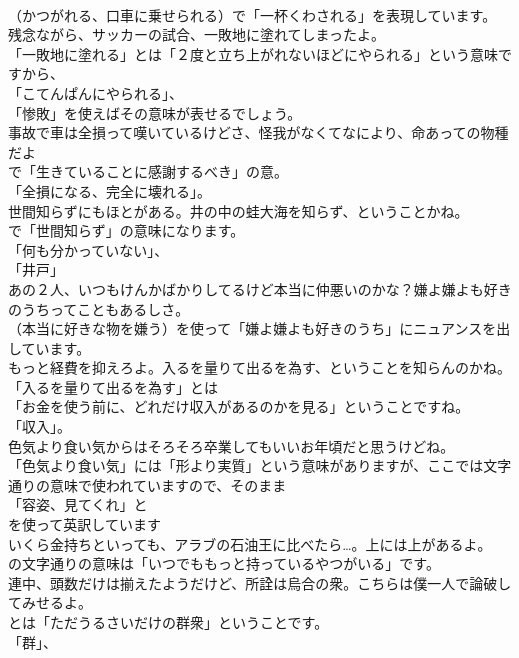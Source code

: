 \documentclass[8pt]{extreport}
\begin{document}
\begin{CJK}{UTF8}{min}
\\	（かつがれる、口車に乗せられる）で「一杯くわされる」を表現しています。	
\\	残念ながら、サッカーの試合、一敗地に塗れてしまったよ。 
\\	「一敗地に塗れる」とは「２度と立ち上がれないほどにやられる」という意味ですから、
\\	「こてんぱんにやられる」、
\\	「惨敗」を使えばその意味が表せるでしょう。	
\\	事故で車は全損って嘆いているけどさ、怪我がなくてなにより、命あっての物種だよ 
\\	で「生きていることに感謝するべき」の意。
\\	「全損になる、完全に壊れる」。	
\\	世間知らずにもほとがある。井の中の蛙大海を知らず、ということかね。 
\\	で「世間知らず」の意味になります。
\\	「何も分かっていない」、
\\	「井戸」	
\\	あの２人、いつもけんかばかりしてるけど本当に仲悪いのかな？嫌よ嫌よも好きのうちってこともあるしさ。 
\\	（本当に好きな物を嫌う）を使って「嫌よ嫌よも好きのうち」にニュアンスを出しています。	
\\	もっと経費を抑えろよ。入るを量りて出るを為す、ということを知らんのかね。 
\\	「入るを量りて出るを為す」とは
\\	「お金を使う前に、どれだけ収入があるのかを見る」ということですね。
\\	「収入」。	
\\	色気より食い気からはそろそろ卒業してもいいお年頃だと思うけどね。 
\\	「色気より食い気」には「形より実質」という意味がありますが、ここでは文字通りの意味で使われていますので、そのまま
\\	「容姿、見てくれ」と
\\	を使って英訳しています	
\\	いくら金持ちといっても、アラブの石油王に比べたら…。上には上があるよ。 
\\	の文字通りの意味は「いつでももっと持っているやつがいる」です。	
\\	連中、頭数だけは揃えたようだけど、所詮は烏合の衆。こちらは僕一人で論破してみせるよ。 
\\	とは「ただうるさいだけの群衆」ということです。
\\	「群」、

\end{CJK}
\end{document}
